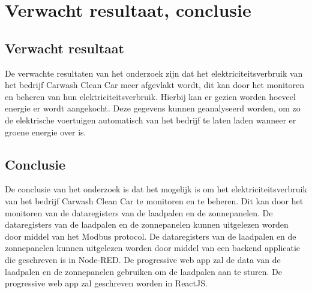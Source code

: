 \newpage
\section{Verwacht resultaat, conclusie}%
\label{sec:verwachte_resultaten}

\subsection{Verwacht resultaat}%
\label{sub:verwacht_resultaat}
De verwachte resultaten van het onderzoek zijn dat het elektriciteitsverbruik van het bedrijf Carwash Clean Car meer afgevlakt wordt, dit kan door het monitoren en beheren van hun elektriciteitsverbruik. Hierbij kan er gezien worden hoeveel energie er wordt aangekocht. Deze gegevens kunnen geanalyseerd worden, om zo de elektrische voertuigen automatisch van het bedrijf te laten laden wanneer er groene energie over is.

\subsection{Conclusie}%
\label{sub:conclusie}
De conclusie van het onderzoek is dat het mogelijk is om het elektriciteitsverbruik van het bedrijf Carwash Clean Car te monitoren en te beheren. Dit kan door het monitoren van de dataregisters van de laadpalen en de zonnepanelen. De dataregisters van de laadpalen en de zonnepanelen kunnen uitgelezen worden door middel van het Modbus protocol. De dataregisters van de laadpalen en de zonnepanelen kunnen uitgelezen worden door middel van een backend applicatie die geschreven is in Node-RED. De progressive web app zal de data van de laadpalen en de zonnepanelen gebruiken om de laadpalen aan te sturen. De progressive web app zal geschreven worden in ReactJS.